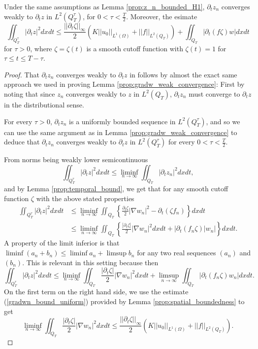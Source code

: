 \documentclass[11pt, a4paper]{article}
\begin{document}
\begin{lemma}
\label{prop:z_t_estimate}
Under the same assumptions as Lemma \ref{prop:z_n_bounded_H1}, $\partial_t z_n$ converges weakly to $\partial_t z$ in $L^2(Q_T^\tau)$, for $0 < \tau < \frac{T}{2}$. Moreover, the esimate
\begin{equation}
\label{z_t_estimate}
\iint_{Q_T^\tau} |\partial_t z|^2 dxdt \leq \frac{||\partial_t \zeta||_\infty}{2}\left( K||u_0||_{L^1(\Omega)} + ||f||_{L^2(Q_T)}\right) + \iint_{Q_T}|\partial_t (f \zeta ) w| dxdt
\end{equation}
for $\tau >0$, where $\zeta=\zeta(t)$ is a smooth cutoff function with $\zeta(t)=1$ for $\tau \leq t \leq T-\tau$.

\end{lemma}
\begin{proof}
That $\partial_t z_n$ converges weakly to $\partial_t z$ in follows by almost the exact same approach we used in proving Lemma \ref{prop:gradw_weak_convergence}: First by noting that since $z_n$ converges weakly to $z$ in $L^2(Q_T)$, $\partial_t z_n$ must converge to $\partial_t z$ in the distributional sense.

For every $\tau > 0$, $\partial_t z_n$ is a uniformly bounded sequence in $L^2(Q_T^\tau)$, and so we can use the same argument as in Lemma \ref{prop:gradw_weak_convergence} to deduce that $\partial_t z_n$ converges weakly to $\partial_t z$ in $L^2(Q_T^\tau)$ for every $0 < \tau < \frac{T}{2}$.

From norms being weakly lower semicontinuous
\begin{equation}
\iint_{Q_T^\tau} |\partial_t z|^2 dxdt \leq \liminf_{n \to \infty} \iint_{Q_T} |\partial_t z_n|^2 dxdt,
\end{equation}
and by Lemma \ref{prop:temporal_bound}, we get that for any smooth cutoff function $\zeta$ with the above stated properties
\begin{align*}
\iint_{Q_T^\tau} |\partial_t z|^2 dxdt &\leq \liminf_{n \to \infty} \iint_{Q_T} \left\{\frac{\partial_t \zeta}{2}|\nabla w_n|^2 - \partial_t (\zeta f_n)\right\} dxdt \\
&\leq \liminf_{n\to \infty}\iint_{Q_T} \left\{ \frac{|\partial_t \zeta|}{2}|\nabla w_n|^2dxdt + |\partial_t (f_n \zeta) |w_n| \right\}dxdt.
\end{align*}
A property of the limit inferior is that $\liminf(a_n + b_n) \leq \liminf a_n + \limsup b_n$ for any two real sequences $(a_n)$ and $(b_n)$. This is relevant in this setting because then
\begin{equation}
\label{z_t_L2_almost_there}
\iint_{Q_T^\tau} |\partial_t z|^2 dxdt\leq \liminf_{n\to \infty} \iint_{Q_T}\frac{|\partial_t \zeta|}{2}|\nabla w_n|^2dxdt + \limsup_{n \to \infty} \iint_{Q_T}|\partial_t (f_n \zeta) w_n| dxdt.
\end{equation}
On the first term on the right hand side, we use the estimate (\ref{gradwn_bound_uniform}) provided by Lemma \ref{prop:spatial_boundedness} to get
\begin{equation*}
\liminf_{n\to \infty} \iint_{Q_T}\frac{|\partial_t \zeta|}{2}|\nabla w_n|^2dxdt \leq \frac{||\partial_t \zeta||_\infty}{2}\left( K||u_0||_{L^1(\Omega)} + ||f||_{L^2(Q_T)}\right).
\end{equation*}


\end{proof}
\end{document}
